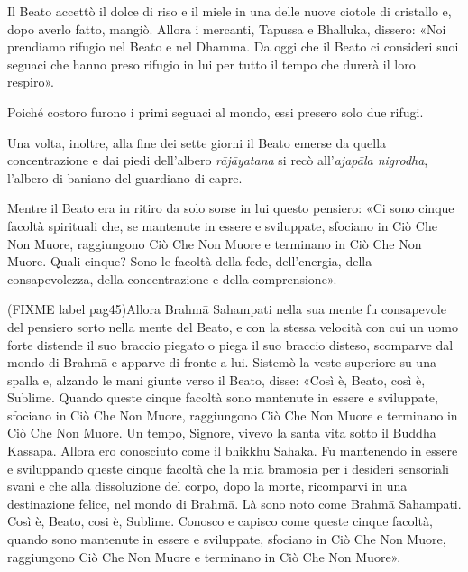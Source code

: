 Il Beato accettò il dolce di riso e il miele in una delle nuove ciotole
di cristallo e, dopo averlo fatto, mangiò. Allora i mercanti, Tapussa e
Bhalluka, dissero: «Noi prendiamo rifugio nel Beato e nel Dhamma. Da
oggi che il Beato ci consideri suoi seguaci che hanno preso rifugio in
lui per tutto il tempo che durerà il loro respiro».


Poiché costoro furono i primi seguaci al mondo, essi presero solo due
rifugi.




 Una volta, inoltre, alla fine dei sette giorni il Beato
emerse da quella concentrazione e dai piedi dell’albero \emph{rājāyatana} si
recò all’\emph{ajapāla nigrodha}, l’albero di baniano del guardiano di capre.


 Mentre il Beato era in ritiro da solo sorse in lui questo
pensiero: «Ci sono cinque facoltà spirituali che, se mantenute in essere
e sviluppate, sfociano in Ciò Che Non Muore, raggiungono Ciò Che Non
Muore e terminano in Ciò Che Non Muore. Quali cinque? Sono le facoltà
della fede, dell’energia, della consapevolezza, della concentrazione e
della comprensione».


(FIXME label pag45)Allora Brahmā Sahampati nella sua mente fu consapevole del pensiero
sorto nella mente del Beato, e con la stessa velocità con cui un uomo
forte distende il suo braccio piegato o piega il suo braccio disteso,
scomparve dal mondo di Brahmā e apparve di fronte a lui. Sistemò la
veste superiore su una spalla e, alzando le mani giunte verso il Beato,
disse: «Così è, Beato, così è, Sublime. Quando queste cinque facoltà
sono mantenute in essere e sviluppate, sfociano in Ciò Che Non Muore,
raggiungono Ciò Che Non Muore e terminano in Ciò Che Non Muore. Un
tempo, Signore, vivevo la santa vita sotto il Buddha Kassapa. Allora ero
conosciuto come il bhikkhu Sahaka. Fu mantenendo in essere e sviluppando
queste cinque facoltà che la mia bramosia per i desideri sensoriali
svanì e che alla dissoluzione del corpo, dopo la morte, ricomparvi in
una destinazione felice, nel mondo di Brahmā. Là sono noto come Brahmā
Sahampati. Così è, Beato, cosi è, Sublime. Conosco e capisco come queste
cinque facoltà, quando sono mantenute in essere e sviluppate, sfociano
in Ciò Che Non Muore, raggiungono Ciò Che Non Muore e terminano in Ciò
Che Non Muore».




